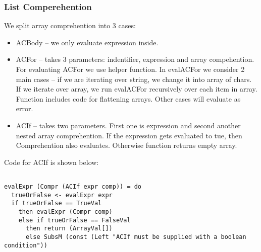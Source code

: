 \documentclass[11pt]{article}
\begin{document}




\subsubsection{List Comperehention}

We split array comprehention into 3 cases: 
\begin{itemize}
\item ACBody -- we only evaluate expression inside.
\item ACFor -- takes 3 parameters: indentifier, expression and array compehention. For evaluating ACFor we use helper function. In evalACFor we consider 2 main cases -- if we are iterating over string, we change it into array of chars. If we iterate over array, we run evalACFor recursively over each item in array. Function includes code for flattening arrays. Other cases will evaluate as error. 
\item ACIf -- takes two parameters. First one is expression and second another nested array comprehention. If the expression gets evaluated to tue, then Comprehention also evaluates. Otherwise function returns empty array.

\end{itemize}
Code for ACIf is shown below:
\begin{verbatim}

evalExpr (Compr (ACIf expr comp)) = do
  trueOrFalse <- evalExpr expr
  if trueOrFalse == TrueVal
    then evalExpr (Compr comp)
    else if trueOrFalse == FalseVal
      then return (ArrayVal[])
      else SubsM (const (Left "ACIf must be supplied with a boolean condition"))
\end{verbatim} 
\end{document}
